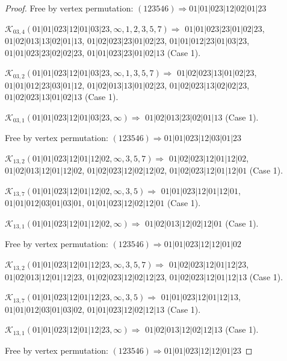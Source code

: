 \documentclass[12pt]{article}
\theoremstyle{plain}
\theoremstyle{definition}
\theoremstyle{remark}
\newcommand{\fancy}[1]{\mathcal{#1}}
\def\K{\fancy{K}}
\begin{document}
\begin{proof}
	
	
	Free by vertex permutation: $(1 2 3 5 4 6)\Rightarrow 01|01|023|12|02|01|23$
	
	
	
	\bigskip
	
	$\K_{03,4}(01|01|023|12|01|03|23,\infty,1, 2, 3, 5, 7)\Rightarrow $ $01|01|023|23|01|02|23$, $01|02|013|13|02|01|13$, $01|02|023|23|01|02|23$, $01|01|012|23|01|03|23$, $01|01|023|23|02|02|23$, $01|01|023|23|01|02|13$ (Case 1).
	
	$\K_{03,2}(01|01|023|12|01|03|23,\infty,1, 3, 5, 7)\Rightarrow $ $01|02|023|13|01|02|23$, $01|01|012|23|03|01|12$, $01|02|013|13|01|02|23$, $01|02|023|13|02|02|23$, $01|02|023|13|01|02|13$ (Case 1).
	
	$\K_{03,1}(01|01|023|12|01|03|23,\infty)\Rightarrow $ $01|02|013|23|02|01|13$ (Case 1).
	
	
	
	Free by vertex permutation: $(1 2 3 5 4 6)\Rightarrow 01|01|023|12|03|01|23$
	
	
	
	\bigskip
	
	$\K_{13,2}(01|01|023|12|01|12|02,\infty,3, 5, 7)\Rightarrow $ $01|02|023|12|01|12|02$, $01|02|013|12|01|12|02$, $01|02|023|12|02|12|02$, $01|02|023|12|01|12|01$ (Case 1).
	
	$\K_{13,7}(01|01|023|12|01|12|02,\infty,3, 5)\Rightarrow $ $01|01|023|12|01|12|01$, $01|01|012|03|01|03|01$, $01|01|023|12|02|12|01$ (Case 1).
	
	$\K_{13,1}(01|01|023|12|01|12|02,\infty)\Rightarrow $ $01|02|013|12|02|12|01$ (Case 1).
	
	
	
	Free by vertex permutation: $(1 2 3 5 4 6)\Rightarrow 01|01|023|12|12|01|02$
	
	
	
	\bigskip
	
	$\K_{13,2}(01|01|023|12|01|12|23,\infty,3, 5, 7)\Rightarrow $ $01|02|023|12|01|12|23$, $01|02|013|12|01|12|23$, $01|02|023|12|02|12|23$, $01|02|023|12|01|12|13$ (Case 1).
	
	$\K_{13,7}(01|01|023|12|01|12|23,\infty,3, 5)\Rightarrow $ $01|01|023|12|01|12|13$, $01|01|012|03|01|03|02$, $01|01|023|12|02|12|13$ (Case 1).
	
	$\K_{13,1}(01|01|023|12|01|12|23,\infty)\Rightarrow $ $01|02|013|12|02|12|13$ (Case 1).
	
	
	
	Free by vertex permutation: $(1 2 3 5 4 6)\Rightarrow 01|01|023|12|12|01|23$
	

\end{proof}
\end{document}
